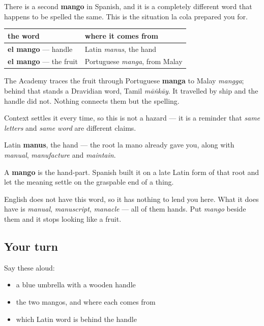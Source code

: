 \begin{grammarlens}[title={Grammar Lens: two mangos, and only one of them grows}]
There is a second \textbf{mango} in Spanish, and it is a completely different word that happens to be spelled the same. This is the situation la cola prepared you for.

\noindent
\begin{tabularx}{\linewidth}{@{}>{\raggedright\arraybackslash}X>{\raggedright\arraybackslash}X@{}}
\toprule
\textbf{the word} & \textbf{where it comes from} \\
\midrule
\textbf{el mango} — handle & Latin \emph{manus}, the hand \\
\textbf{el mango} — the fruit & Portuguese \emph{manga}, from Malay \\
\bottomrule
\end{tabularx}

The Academy traces the fruit through Portuguese \textbf{manga} to Malay \emph{mangga}; behind that stands a Dravidian word, Tamil \emph{māṅkāy}. It travelled by ship and the handle did not. Nothing connects them but the spelling.

Context settles it every time, so this is not a hazard — it is a reminder that \emph{same letters} and \emph{same word} are different claims.
\end{grammarlens}

\begin{cousinweb}
Latin \textbf{manus}, the hand — the root la mano already gave you, along with \emph{manual}, \emph{manufacture} and \emph{maintain}.

A \textbf{mango} is the hand-part. Spanish built it on a late Latin form of that root and let the meaning settle on the graspable end of a thing.

English does not have this word, so it has nothing to lend you here. What it does have is \emph{manual}, \emph{manuscript}, \emph{manacle} — all of them hands. Put \emph{mango} beside them and it stops looking like a fruit.
\end{cousinweb}

\subsection*{Your turn}
Say these aloud:

\begin{itemize}
\raggedright
  \item a blue umbrella with a wooden handle
  \item the two mangos, and where each comes from
  \item which Latin word is behind the handle
\end{itemize}

